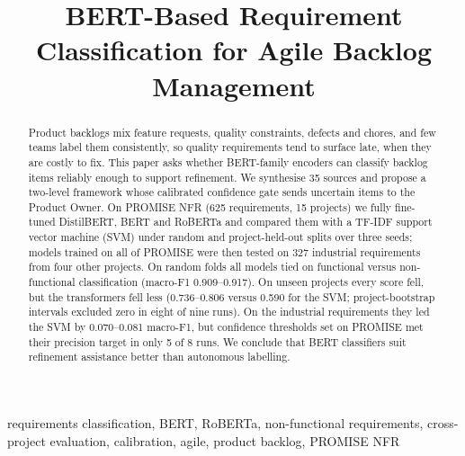 \documentclass[conference,10pt,letterpaper]{IEEEtran}
\begin{document}

\title{BERT-Based Requirement Classification for Agile Backlog Management}
\author{}
\maketitle
\begin{abstract}Product backlogs mix feature requests, quality constraints, defects and chores, and few teams label them consistently, so quality requirements tend to surface late, when they are costly to fix. This paper asks whether BERT-family encoders can classify backlog items reliably enough to support refinement. We synthesise 35 sources and propose a two-level framework whose calibrated confidence gate sends uncertain items to the Product Owner. On PROMISE NFR (625 requirements, 15 projects) we fully fine-tuned DistilBERT, BERT and RoBERTa and compared them with a TF-IDF support vector machine (SVM) under random and project-held-out splits over three seeds; models trained on all of PROMISE were then tested on 327 industrial requirements from four other projects. On random folds all models tied on functional versus non-functional classification (macro-F1 0.909–0.917). On unseen projects every score fell, but the transformers fell less (0.736–0.806 versus 0.590 for the SVM; project-bootstrap intervals excluded zero in eight of nine runs). On the industrial requirements they led the SVM by 0.070–0.081 macro-F1, but confidence thresholds set on PROMISE met their precision target in only 5 of 8 runs. We conclude that BERT classifiers suit refinement assistance better than autonomous labelling.\end{abstract}
\begin{IEEEkeywords}requirements classification, BERT, RoBERTa, non-functional requirements, cross-project evaluation, calibration, agile, product backlog, PROMISE NFR\end{IEEEkeywords}
\end{document}
